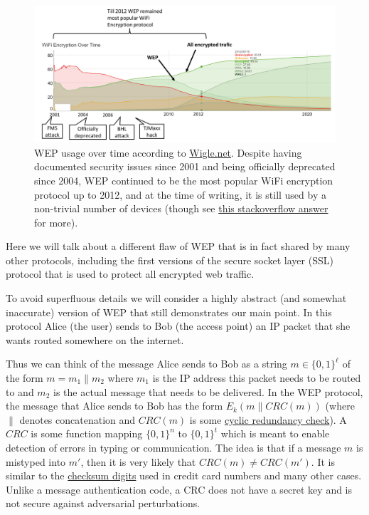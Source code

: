 \begin{figure}
\centering
\includegraphics[width=\textwidth, height=0.25\paperheight, keepaspectratio]{../figure/WEP.png}
\caption{WEP usage over time according to
\href{https://wigle.net/stats}{Wigle.net}. Despite having documented
security issues since 2001 and being officially deprecated since 2004,
WEP continued to be the most popular WiFi encryption protocol up to
2012, and at the time of writing, it is still used by a non-trivial
number of devices (though see
\href{https://security.stackexchange.com/a/191076}{this stackoverflow
answer} for more).}
\label{wepusage}
\end{figure}

Here we will talk about a different flaw of WEP that is in fact shared
by many other protocols, including the first versions of the secure
socket layer (SSL) protocol that is used to protect all encrypted web
traffic.

To avoid superfluous details we will consider a highly abstract (and
somewhat inaccurate) version of WEP that still demonstrates our main
point. In this protocol Alice (the user) sends to Bob (the access point)
an IP packet that she wants routed somewhere on the internet.

Thus we can think of the message Alice sends to Bob as a string
\(m\in\{0,1\}^\ell\) of the form \(m=m_1\|m_2\) where \(m_1\) is the IP
address this packet needs to be routed to and \(m_2\) is the actual
message that needs to be delivered. In the WEP protocol, the message
that Alice sends to Bob has the form
\(E_k(m\|\ensuremath{\mathit{CRC}}(m))\) (where \(\|\) denotes
concatenation and \(\ensuremath{\mathit{CRC}}(m)\) is some
\href{https://en.wikipedia.org/wiki/Cyclic_redundancy_check}{cyclic
redundancy check}). A \(\ensuremath{\mathit{CRC}}\) is some function
mapping \(\{0,1\}^n\) to \(\{0,1\}^t\) which is meant to enable
detection of errors in typing or communication. The idea is that if a
message \(m\) is mistyped into \(m'\), then it is very likely that
\(\ensuremath{\mathit{CRC}}(m) \neq \ensuremath{\mathit{CRC}}(m')\). It
is similar to the
\href{https://en.wikipedia.org/wiki/Luhn_algorithm}{checksum digits}
used in credit card numbers and many other cases. Unlike a message
authentication code, a CRC does not have a secret key and is not secure
against adversarial perturbations.

